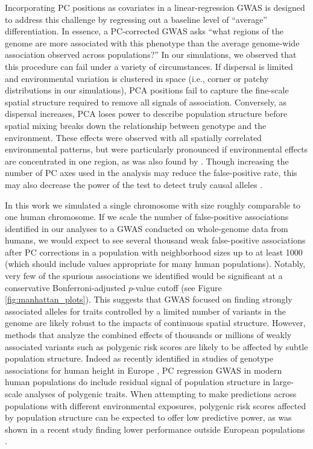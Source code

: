 \documentclass[10pt,twoside,lineno,hidelinks]{preprint}
\begin{document}
Incorporating PC positions as covariates in a linear-regression GWAS \citep{Price2006} is designed to address this challenge by regressing out a baseline level of ``average'' differentiation. 
In essence, a PC-corrected GWAS asks ``what regions of the genome are more associated with this phenotype than the average genome-wide association observed across populations?'' 
In our simulations, we observed that this procedure can fail under a variety of circumstances. 
If dispersal is limited and environmental variation is clustered in space (i.e., corner or patchy distributions in our simulations), PCA positions fail to capture the fine-scale spatial structure required to remove all signals of association. Conversely, as dispersal increases, PCA loses power to describe population structure before spatial mixing breaks down the relationship between genotype and the environment. These effects were observed with all spatially correlated environmental patterns, but were particularly pronounced if environmental effects are concentrated in one region, as was also found by \citet{Mathieson2012}. Though increasing the number of PC axes used in the analysis may reduce the false-positive rate, this may also decrease the power of the test to detect truly causal alleles \citep{Lawson2019}. 

In this work we simulated a single chromosome with size roughly comparable to one human chromosome. If we scale the number of false-positive associations identified in our analyses to a GWAS conducted on whole-genome data from humans, we would expect to see several thousand weak false-positive associations after PC corrections in a population with neighborhood sizes up to at least 1000 (which should include values appropriate for many human populations). Notably, very few of the spurious associations we identified would be significant at a conservative Bonferroni-adjusted $p$-value cutoff (see Figure \ref{fig:manhattan_plots}). This suggests that GWAS focused on finding strongly associated alleles for traits controlled by a limited number of variants in the genome are likely robust to the impacts of continuous spatial structure. However, methods that analyze the combined effects of thousands or millions of weakly associated variants such as polygenic risk scores \citep{Khera2018} are likely to be affected by subtle population structure. Indeed as recently identified in studies of genotype associations for human height in Europe \citep{Berg2018,Sohail2018}, PC regression GWAS in modern human populations do include residual signal of population structure in large-scale analyses of polygenic traits. When attempting to make predictions across populations with different environmental exposures, polygenic risk scores affected by population structure can be expected to offer low predictive power, as was shown in a recent study finding lower performance outside European populations \citep{Martin2019}. 
\end{document}
